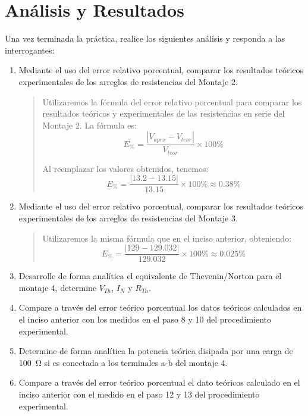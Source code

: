 \documentclass{article}
\begin{document}
    \section{Análisis y Resultados}

    Una vez terminada la práctica, realice los siguientes análisis y responda a las interrogantes:
    
    \begin{enumerate}[label=\alph*.-]
        \item Mediante el uso del error relativo porcentual, comparar los resultados teóricos experimentales de los arreglos de resistencias del Montaje 2.
        
        \begin{quote}
            Utilizaremos la fórmula del error relativo porcentual para comparar los resultados teóricos y experimentales de las resistencias en serie del Montaje 2. La fórmula es:
            \[
                E_{\%} = \frac{\left|V_{aprx} - V_{teor}\right|}{V_{teor}} \times 100\%
            \]

            Al reemplazar los valores obtenidos, tenemos:
            \[
                E_{\%} = \frac{\left|13.2 - 13.15\right|}{13.15} \times 100\% \approx 0.38\%
            \]
        \end{quote}

        \item Mediante el uso del error relativo porcentual, comparar los resultados teóricos experimentales de los arreglos de resistencias del Montaje 3.
        
        \begin{quote}
            Utilizaremos la misma fórmula que en el inciso anterior, obteniendo:
            \[
                E_{\%} = \frac{\left|129 - 129.032\right|}{129.032} \times 100\% \approx 0.025\%
            \]
        \end{quote}

        \item Desarrolle de forma analítica el equivalente de Thevenin/Norton para el montaje 4, determine $V_{Th}$, $I_N$ y $R_{Th}$.
        
        \item Compare a través del error teórico porcentual los datos teóricos calculados en el inciso anterior con los medidos en el paso 8 y 10 del procedimiento experimental.
        
        \item Determine de forma analítica la potencia teórica disipada por una carga de \SI{100}{\ohm} si es conectada a los terminales a-b del montaje 4.
        
        \item Compare a través del error teórico porcentual el dato teóricos calculado en el inciso anterior con el medido en el paso 12 y 13 del procedimiento experimental.
    \end{enumerate}
\end{document}
